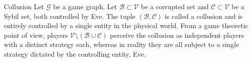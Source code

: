 {}
\begin{definitiongr}{Collusion}
  Let $\mathcal{G}$ be a game graph. Let $\mathcal{B} \subset \mathcal{V}$ be a corrupted set and $\mathcal{C} \subset
  \mathcal{V}$ be a Sybil set, both controlled by Eve. The tuple $\left(\mathcal{B}, \mathcal{C}\right)$ is called a
  collusion and is entirely controlled by a single entity in the physical world. From a game theoretic point of view,
  players $\mathcal{V} \setminus (\mathcal{B} \cup \mathcal{C})$ perceive the collusion as independent players with a
  distinct strategy each, whereas in reality they are all subject to a single strategy dictated by the controlling
  entity, Eve.
\end{definitiongr}
